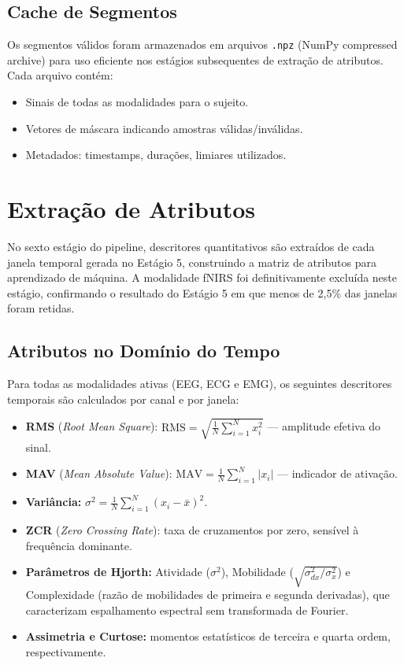 \subsection{Cache de Segmentos}

Os segmentos válidos foram armazenados em arquivos \texttt{.npz} (NumPy compressed archive) para uso eficiente nos estágios subsequentes de extração de atributos. Cada arquivo contém:
\begin{itemize}
    \item Sinais de todas as modalidades para o sujeito.
    \item Vetores de máscara indicando amostras válidas/inválidas.
    \item Metadados: timestamps, durações, limiares utilizados.
\end{itemize}

\section{Extração de Atributos}
\label{sec:metodo_extracao}

No sexto estágio do pipeline, descritores quantitativos são extraídos de cada janela temporal gerada no Estágio 5, construindo a matriz de atributos para aprendizado de máquina. A modalidade fNIRS foi definitivamente excluída neste estágio, confirmando o resultado do Estágio 5 em que menos de 2,5\% das janelas foram retidas.

\subsection{Atributos no Domínio do Tempo}

Para todas as modalidades ativas (EEG, ECG e EMG), os seguintes descritores temporais são calculados por canal e por janela:

\begin{itemize}
    \item \textbf{RMS} (\textit{Root Mean Square}): $\text{RMS} = \sqrt{\frac{1}{N}\sum_{i=1}^{N} x_i^2}$ — amplitude efetiva do sinal.
    \item \textbf{MAV} (\textit{Mean Absolute Value}): $\text{MAV} = \frac{1}{N}\sum_{i=1}^{N} |x_i|$ — indicador de ativação.
    \item \textbf{Variância:} $\sigma^2 = \frac{1}{N}\sum_{i=1}^{N}(x_i - \bar{x})^2$.
    \item \textbf{ZCR} (\textit{Zero Crossing Rate}): taxa de cruzamentos por zero, sensível à frequência dominante.
    \item \textbf{Parâmetros de Hjorth:} Atividade ($\sigma^2$), Mobilidade ($\sqrt{\sigma^2_{dx}/\sigma^2_x}$) e Complexidade (razão de mobilidades de primeira e segunda derivadas), que caracterizam espalhamento espectral sem transformada de Fourier.
    \item \textbf{Assimetria e Curtose:} momentos estatísticos de terceira e quarta ordem, respectivamente.
\end{itemize}


